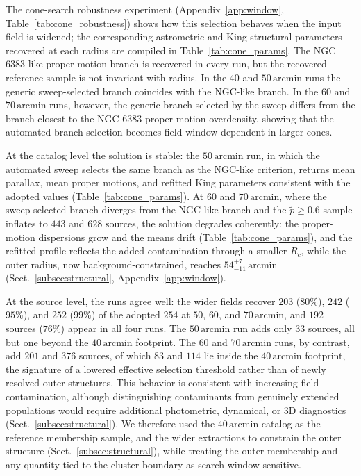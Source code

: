 \documentclass{aa}
\begin{document}
The cone-search robustness experiment (Appendix~\ref{app:window}, Table~\ref{tab:cone_robustness}) shows how this selection behaves when the input field is widened; the corresponding astrometric and King-structural parameters recovered at each radius are compiled in Table~\ref{tab:cone_params}. The NGC 6383-like proper-motion branch is recovered in every run, but the recovered reference sample is not invariant with radius. In the $40$ and $50\,\mathrm{arcmin}$ runs the generic sweep-selected branch coincides with the NGC-like branch. In the $60$ and $70\,\mathrm{arcmin}$ runs, however, the generic branch selected by the sweep differs from the branch closest to the NGC 6383 proper-motion overdensity, showing that the automated branch selection becomes field-window dependent in larger cones.

At the catalog level the solution is stable: the $50\,\mathrm{arcmin}$ run, in which the automated sweep selects the same branch as the NGC-like criterion, returns mean parallax, mean proper motions, and refitted King parameters consistent with the adopted values (Table~\ref{tab:cone_params}). At $60$ and $70\,\mathrm{arcmin}$, where the sweep-selected branch diverges from the NGC-like branch and the $\tilde{p}\geq0.6$ sample inflates to $443$ and $628$ sources, the solution degrades coherently: the proper-motion dispersions grow and the means drift (Table~\ref{tab:cone_params}), and the refitted profile reflects the added contamination through a smaller $R_c$, while the outer radius, now background-constrained, reaches $54^{+7}_{-11}\,\mathrm{arcmin}$ (Sect.~\ref{subsec:structural}, Appendix~\ref{app:window}).

At the source level, the runs agree well: the wider fields recover $203$ ($80\%$), $242$ ($95\%$), and $252$ ($99\%$) of the adopted $254$ at $50$, $60$, and $70\,\mathrm{arcmin}$, and $192$ sources ($76\%$) appear in all four runs. The $50\,\mathrm{arcmin}$ run adds only $33$ sources, all but one beyond the $40\,\mathrm{arcmin}$ footprint. The $60$ and $70\,\mathrm{arcmin}$ runs, by contrast, add $201$ and $376$ sources, of which $83$ and $114$ lie inside the $40\,\mathrm{arcmin}$ footprint, the signature of a lowered effective selection threshold rather than of newly resolved outer structures. This behavior is consistent with increasing field contamination, although distinguishing contaminants from genuinely extended populations would require additional photometric, dynamical, or 3D diagnostics (Sect.~\ref{subsec:structural}). We therefore used the $40\,\mathrm{arcmin}$ catalog as the reference membership sample, and the wider extractions to constrain the outer structure (Sect.~\ref{subsec:structural}), while treating the outer membership and any quantity tied to the cluster boundary as search-window sensitive.
\end{document}
